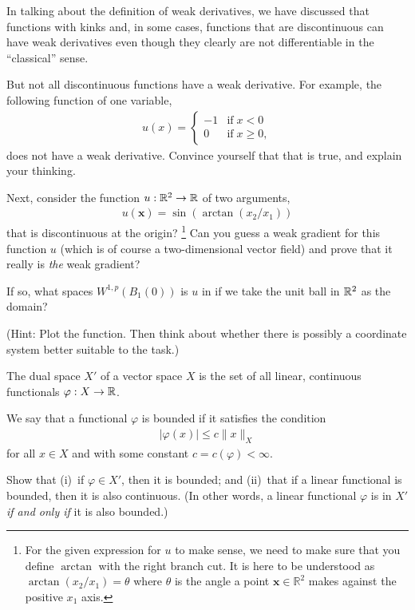 \documentclass[12pt]{memoir}
\begin{document}
\begin{Ej}
  In talking about the definition of weak derivatives, we have
  discussed that functions with kinks and, in some cases, functions
  that are discontinuous can have weak derivatives even though they
  clearly are not differentiable in the ``classical'' sense.
  
But not all discontinuous functions have a weak derivative. For example,
the following function of one variable,
\begin{align*}
  u(x) = \begin{cases}
    -1 & \text{if}\; x<0
    \\
    0 & \text{if}\; x\ge 0,
  \end{cases}
\end{align*}
does not have a weak derivative. Convince yourself that that is true,
and explain your thinking.

Next, consider the function $u : \mathbb{R}^2 \rightarrow \mathbb{R}$ of two arguments,
\begin{align*}
  u(\mathbf x) = \sin(\arctan(x_2/x_1))
\end{align*}
that is discontinuous at the origin?%
\footnote{For the given expression for $u$ to make sense, we need to
  make sure that you define $\arctan$ with the right branch cut. It is
  here to be understood as $\arctan(x_2/x_1)=\theta$ where $\theta$ is
  the angle a point $\mathbf x\in{\mathbb R}^2$ makes against the
  positive $x_1$ axis.}
Can you guess a weak gradient for
this function $u$ (which is of course a two-dimensional vector field) and
prove that it really is \textit{the} weak gradient?

If so, what spaces $W^{1,p}(B_1(0))$ is $u$ in if we take
the unit ball in $\mathbb{R}^2$ as the domain?

(Hint: Plot the function. Then think about whether there is possibly a
coordinate system better suitable to the task.)
\end{Ej}

\begin{ptcbr}
  
\end{ptcbr}

\begin{Ej}
    The dual space $X'$ of a vector space $X$ is the set of all linear,
continuous functionals $\varphi: X \rightarrow \mathbb{R}$.

We say that a functional $\varphi$ is
bounded if it satisfies the condition
\begin{align*}
  |\varphi(x)| \le c \|x\|_X
\end{align*}
for all $x\in X$ and with some constant $c=c(\varphi)<\infty$.

Show that (i)~if $\varphi\in X'$, then it is bounded; and
(ii)~that if a linear functional is bounded, then it is also
continuous. (In other words, a linear functional $\varphi$ is in $X'$
\textit{if and only if} it is also bounded.)
\end{Ej}
\end{document}

